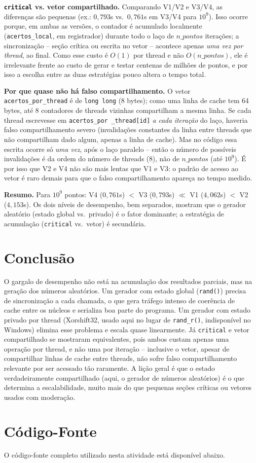 \documentclass[a4paper,12pt]{article}
\begin{document}
\textbf{\texttt{critical} vs. vetor compartilhado.} Comparando V1/V2 e V3/V4, as diferenças são pequenas
(ex.: $0,793$s vs.\ $0,761$s em V3/V4 para $10^9$). Isso ocorre porque, em ambas as versões, o contador é
acumulado localmente (\texttt{acertos\_local}, em registrador) durante todo o laço de $n\_pontos$
iterações; a sincronização -- seção crítica ou escrita no vetor -- acontece apenas \emph{uma vez por
thread}, ao final. Como esse custo é $O(1)$ por thread e não $O(n\_pontos)$, ele é irrelevante frente ao
custo de gerar e testar centenas de milhões de pontos, e por isso a escolha entre as duas estratégias
pouco altera o tempo total.

\textbf{Por que quase não há falso compartilhamento.} O vetor \texttt{acertos\_por\_thread} é de
\texttt{long long} (8 bytes); como uma linha de cache tem 64 bytes, até 8 contadores de threads vizinhas
compartilham a mesma linha. Se cada thread escrevesse em \texttt{acertos\_por
\_thread[id]} \emph{a cada
iteração} do laço, haveria falso compartilhamento severo (invalidações constantes da linha entre threads
que não compartilham dado algum, apenas a linha de cache). Mas no código essa escrita ocorre só
\emph{uma vez}, após o laço paralelo -- então o número de possíveis invalidações é da ordem do número de
threads ($8$), não de $n\_pontos$ (até $10^9$). É por isso que V2 e V4 não são mais lentas que V1 e V3:
o padrão de acesso ao vetor é raro demais para que o falso compartilhamento apareça no tempo medido.

\textbf{Resumo.} Para $10^9$ pontos: V4 ($0,761$s) $<$ V3 ($0,793$s) $\ll$ V1 ($4,062$s) $<$ V2
($4,153$s). Os dois níveis de desempenho, bem separados, mostram que o gerador aleatório (estado global vs.\
privado) é o fator dominante; a estratégia de acumulação (\texttt{critical} vs.\ vetor) é secundária.

\section{Conclusão}

O gargalo de desempenho não está na acumulação dos resultados parciais, mas na geração dos números
aleatórios. Um gerador com estado global (\texttt{rand()}) precisa de sincronização a cada chamada, o que
gera tráfego intenso de coerência de cache entre os núcleos e serializa boa parte do programa. Um gerador
com estado privado por thread (Xorshift32, usado aqui no lugar de \texttt{rand\_r()}, indisponível no
Windows) elimina esse problema e escala quase linearmente. Já \texttt{critical} e vetor compartilhado se
mostraram equivalentes, pois ambos custam apenas uma operação por thread, e não uma por iteração --
inclusive o vetor, apesar de compartilhar linhas de cache entre threads, não sofre falso compartilhamento
relevante por ser acessado tão raramente. A lição geral é que o estado verdadeiramente compartilhado (aqui,
o gerador de números aleatórios) é o que determina a escalabilidade, muito mais do que pequenas seções
críticas ou vetores usados com moderação.

\newpage
\appendix

\section{Código-Fonte}
\label{sec:codigo}

O código-fonte completo utilizado nesta atividade está disponível abaixo.


\end{document}
